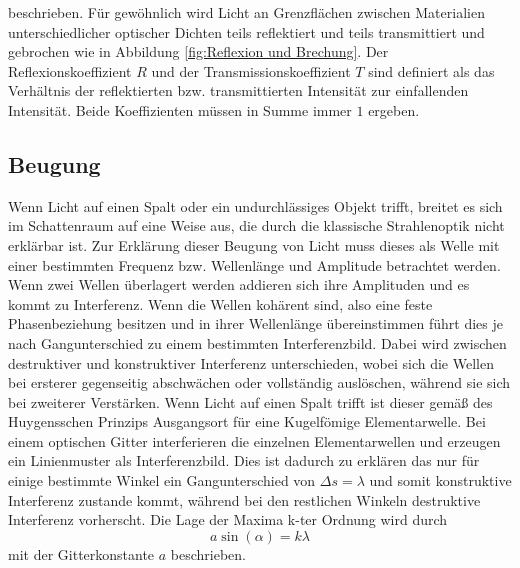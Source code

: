 beschrieben. Für gewöhnlich wird Licht an Grenzflächen zwischen Materialien unterschiedlicher optischer Dichten teils reflektiert und teils transmittiert und gebrochen wie in Abbildung \ref{fig:Reflexion und Brechung}. Der Reflexionskoeffizient $R$ und der Transmissionskoeffizient $T$ sind definiert als das Verhältnis der reflektierten bzw. transmittierten Intensität zur einfallenden Intensität. Beide Koeffizienten müssen in Summe immer $1$ ergeben.
\subsection{Beugung}
Wenn Licht auf einen Spalt oder ein undurchlässiges Objekt trifft, breitet es sich im Schattenraum auf eine Weise aus, die durch die klassische Strahlenoptik nicht erklärbar ist.
Zur Erklärung dieser Beugung von Licht muss dieses als Welle mit einer bestimmten Frequenz bzw. Wellenlänge und Amplitude betrachtet werden. Wenn zwei Wellen überlagert werden addieren sich ihre Amplituden und es kommt zu Interferenz. Wenn die Wellen kohärent sind, also eine feste Phasenbeziehung besitzen und in ihrer Wellenlänge übereinstimmen führt dies je nach Gangunterschied zu einem bestimmten Interferenzbild. Dabei wird zwischen destruktiver und konstruktiver Interferenz unterschieden, wobei sich die Wellen bei ersterer gegenseitig abschwächen oder vollständig auslöschen, während sie sich bei zweiterer Verstärken. Wenn Licht auf einen Spalt trifft ist dieser gemäß des Huygensschen Prinzips Ausgangsort für eine Kugelfömige Elementarwelle. Bei einem optischen Gitter interferieren die einzelnen Elementarwellen und erzeugen ein Linienmuster als Interferenzbild. Dies ist dadurch zu erklären das nur für einige bestimmte Winkel ein Gangunterschied von $\Delta s=\lambda$ und somit konstruktive Interferenz zustande kommt, während bei den restlichen Winkeln destruktive Interferenz vorherscht. Die Lage der Maxima k-ter Ordnung wird durch
\begin{equation}
a\sin(\alpha)=k\lambda
\end{equation}
mit der Gitterkonstante $a$ beschrieben.
